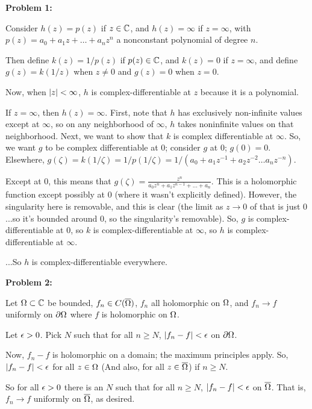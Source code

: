 \documentclass[a4paper,12pt]{article}
\begin{document}
{\bf Problem 1:} %

Consider $h(z) = p(z)$ if $z \in \mathbb{C}$, and $h(z) = \infty$ if $z = \infty$, with $p(z) = a_0 + a_1z + \ldots + a_nz^n$ a nonconstant polynomial of degree $n$.

Then define $k(z) = 1/p(z)$ if $p(z) \in \mathbb{C}$, and $k(z) = 0$ if $z = \infty$, and define $g(z) = k(1/z)$ when $z \neq 0$ and $g(z) = 0$ when $z = 0$.

Now, when $\left\lvert z \right\rvert < \infty$, $h$ is complex-differentiable at $z$ because it is a polynomial.

If $z = \infty$, then $h(z) = \infty$. First, note that $h$ has exclusively non-infinite values except at $\infty$, so on any neighborhood of $\infty$, $h$ takes noninfinite values on that neighborhood. Next, we want to show that $k$ is complex differentiable at $\infty$. So, we want $g$ to be complex differentiable at $0$; consider $g$ at $0$; $g(0) = 0$. Elsewhere, $g(\zeta) = k(1/\zeta) = 1/p(1/\zeta) = 1/(a_0+a_1z^{-1} + a_2z^{-2} \ldots a_nz^{-n})$.

Except at $0$, this means that $g(\zeta) = \frac{z^n}{a_0z^n + a_1z^{n-1} + \ldots + a_n}$. This is a holomorphic function except possibly at $0$ (where it wasn't explicitly defined). However, the singularity here is removable, and this is clear (the limit as $z \to 0$ of that is just $0$...so it's bounded around $0$, so the singularity's removable). So, $g$ is complex-differentiable at $0$, so $k$ is complex-differentiable at $\infty$, so $h$ is complex-differentiable at $\infty$. 

...So $h$ is complex-differentiable everywhere.

\shunt

{\bf Problem 2:}

Let $\Omega \subset \mathbb{C}$ be bounded, $f_n \in C(\overline{\Omega})$, $f_n$ all holomorphic on $\Omega$, and $f_n \to f$ uniformly on $\partial \Omega$ where $f$ is holomorphic on $\Omega$.

Let $\epsilon >0$. Pick $N$ such that for all $n \geq N$, $\left\lvert f_n - f \right\rvert < \epsilon$ on $\partial \Omega$.

Now, $f_n - f$ is holomorphic on a domain; the maximum principles apply. So, $\left\lvert f_n - f \right\rvert < \epsilon$ for all $z \in \Omega$ (And also, for all $z \in \overline{\Omega}$) if $n \geq N$.

So for all $\epsilon>0$ there is an $N$ such that for all $n \geq N$, $\left\lvert f_n-f \right\rvert < \epsilon$ on $\overline{\Omega}$. That is, $f_n \to f$ uniformly on $\overline{\Omega}$, as desired.  
\end{document}
